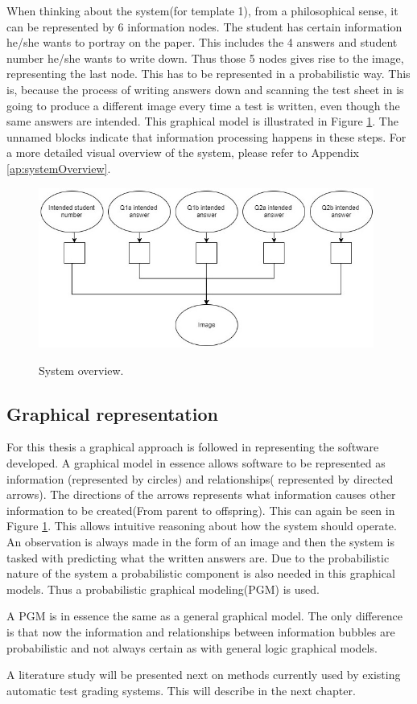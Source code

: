When thinking about the system(for template 1), from a philosophical sense, it can be represented by 6 information nodes. The student has certain information he/she wants to portray on the paper. This includes the 4 answers and student number he/she wants to write down. Thus those 5 nodes gives rise to the image, representing the last node. This has to be represented in a probabilistic way. This is, because the process of writing answers down and scanning the test sheet in is going to produce a different image every time a test is written, even though the same answers are intended. This graphical model is illustrated in Figure \ref{fig:systemOverview}. The unnamed blocks indicate that information processing happens in these steps. For a more detailed visual overview of the system, please refer to Appendix \ref{ap:systemOverview}.
\begin{figure}
  \centering
  \includegraphics[width=11cm]{systemOverview}\\
  \caption{System overview.}
  \label{fig:systemOverview}
\end{figure}


\subsection{Graphical representation}

For this thesis a graphical approach is followed in representing the software developed. A graphical model in essence allows software to be represented as information (represented by circles) and relationships( represented by directed arrows). The directions of the arrows represents what information causes other information to be created(From parent to offspring). This can again be seen in Figure \ref{fig:systemOverview}. This allows intuitive reasoning about how the system should operate. An observation is always made in the form of an image and then the system is tasked with predicting what the written answers are. Due to the probabilistic nature of the system a probabilistic component is also needed in this graphical models. Thus a probabilistic graphical modeling(PGM) is used.

A PGM is in essence the same as a general graphical model. The only difference is that now the information and relationships between information bubbles are probabilistic and not always certain as with general logic graphical models.

A literature study will be presented next on methods currently used by existing automatic test grading systems. This will describe in the next chapter.